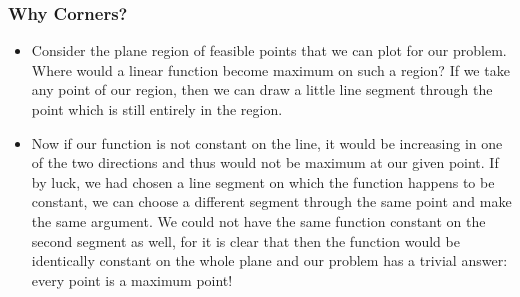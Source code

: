 \begin{frame}%
  \frametitle{ Why Corners?}
  \begin{itemize}%

\item
Consider the plane region of feasible points that we can plot for our problem.
Where would a linear function become maximum on such a region?
If we take any point  of our region, then we can
draw a little line segment through the point which is still entirely
in the region.
\item
Now if our function is not constant on the line, it would be increasing
in one of the two directions and thus would not be maximum at our given point. 
If by luck, we had chosen a line segment on which the function happens to be
constant, we can choose a different segment through the same point and
make the same argument.
We could not have the same function constant on the second segment as well,
for it is clear that then the function would be identically constant on
the whole plane  and our problem has a trivial answer:
every point is a maximum point!
\end{itemize}
\end{frame}


